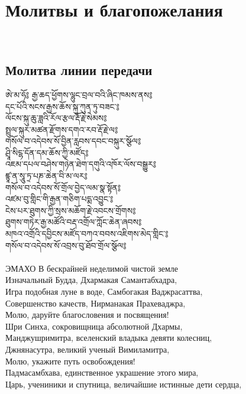 \section{Молитвы и благопожелания}
\\
\subsection{Молитва линии передачи}
\vspace{0.5cm}
\ti
ཨེ་མ་ཧོ༔ རྒྱ་ཆད་ཕྱོགས་ལྷུང་བྲལ་བའི་ཞིང་ཁམས་ནས༔ \\
དང་པོའི་སངས་རྒྱས་ཆོས་སྐུ་ཀུན་ཏུ་བཟང་༔ \\
ལོངས་སྐུ་ཆུ་ཟླའི་རོལ་རྩལ་རྡོ་རྗེ་སེམས༔ \\
སྤྲུལ་སྐུར་མཚན་རྫོགས་དགའ་རབ་རྡོ་རྗེ་ལ༔ \\
གསོལ་བ་འདེབས་སོ་བྱིན་རླབས་དབང་བསྐུར་སྩོལ༔ \\
ཤྲཱི་སིངྷ་དོན་དམ་ཆོས་ཀྱི་མཛོད༔ \\
འཇམ་དཔལ་བཤེས་གཉེན་ཐེག་དགུའི་འཁོར་ལོས་བསྒྱུར༔ \\
ཛྙཱ་ན་སཱུ་ཏྲ་པཎ་ཆེན་བི་མ་ལར༔ \\
གསོལ་བ་འདེབས་སོ་གྲོལ་བྱེད་ལམ་སྣ་སྟོན༔ \\
འཛམ་བུ་གླིང་གི་རྒྱན་གཅིག་པདྨ་འབྱུང་༔ \\
ངེས་པར་ཐུགས་ཀྱི་སྲས་མཆོག་རྗེ་འབངས་གྲོགས༔ \\
ཐུགས་གཏེར་རྒྱ་མཚོའི་བརྡ་འགྲོལ་ཀློང་ཆེན་ཞབས༔ \\
མཁའ་འགྲོའི་དབྱིངས་མཛོད་བཀའ་བབས་འཇིགས་མེད་གླིང་༔ \\
གསོལ་བ་འདེབས་སོ་འབྲས་བུ་ཐོབ་གྲོལ་སྩོལ༔ \\
\\
\ru
ЭМАХО В бескрайней неделимой чистой земле\\
Изначальный Будда, Дхармакая Самантабхадра,\\
Игра подобная луне в воде, Самбогакая Ваджрасаттва,\\
Совершенство качеств, Нирманакая Прахеваджра,\\
Молю, даруйте благословения и посвящения!\\
Шри Синха, сокровищница абсолютной Дхармы,\\
Манджушримитра, вселенский владыка девяти колесниц,\\
Джнянасутра, великий ученый Вимиламитра,\\
Молю, укажите путь освобождения!\\
\newpage
Падмасамбхава, единственное украшение этого мира,\\
Царь, учениники и спутница, величайшие истинные дети сердца,\\
